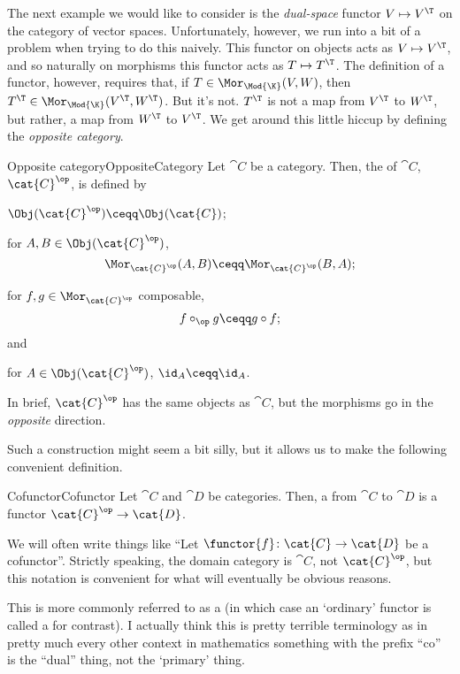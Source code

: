 The next example we would like to consider is the \emph{dual-space} functor $V\mapsto V^{\T}$ on the category of vector spaces.  Unfortunately, however, we run into a bit of a problem when trying to do this naively.  This functor on objects acts as $V\mapsto V^{\T}$, and so naturally on morphisms this functor acts as $T\mapsto T^{\T}$.  The definition of a functor, however, requires that, if $T\in \Mor _{\Mod{\K}}(V,W)$, then $T^{\T}\in \Mor _{\Mod{\K}}(V^{\T},W^{\T})$.  But it's not.  $T^{\T}$ is not a map from $V^{\T}$ to $W^{\T}$, but rather, a map from $W^{\T}$ to $V^{\T}$.  We get around this little hiccup by defining the \emph{opposite category}.
\begin{dfn}{Opposite category}{OppositeCategory}
	Let $\cat{C}$ be a category.  Then, the  of $\cat{C}$, $\cat{C}^{\op}$, is defined by
	\begin{data}
		\item $\Obj (\cat{C}^{\op})\ceqq \Obj (\cat{C})$;
		\item for $A,B\in \Obj (\cat{C}^{\op})$,
		\begin{equation}
		\Mor _{\cat{C}^{\op}}(A,B)\ceqq \Mor _{\cat{C}^{\op}}(B,A);
		\end{equation}
		\item for $f,g\in \Mor _{\cat{C}^{\op}}$ composable,
		\begin{equation}
		f\circ _{\op}g\ceqq g\circ f;
		\end{equation}
		and
		\item for $A\in \Obj (\cat{C}^{\op})$, $\id _A\ceqq \id _A$.
	\end{data}
	\begin{rmk}
		In brief, $\cat{C}^{\op}$ has the same objects as $\cat{C}$, but the morphisms go in the \emph{opposite} direction.
	\end{rmk}
\end{dfn}
Such a construction might seem a bit silly, but it allows us to make the following convenient definition.
\begin{dfn}{Cofunctor}{Cofunctor}
	Let $\cat{C}$ and $\cat{D}$ be categories.  Then, a  from $\cat{C}$ to $\cat{D}$ is a functor $\cat{C}^{\op}\rightarrow \cat{D}$.
	\begin{rmk}
		We will often write things like ``Let $\functor{f}\colon \cat{C}\rightarrow \cat{D}$ be a cofunctor\textellipsis ''.  Strictly speaking, the domain category is $\cat{C}$, not $\cat{C}^{\op}$, but this notation is convenient for what will eventually be obvious reasons.
	\end{rmk}
	\begin{rmk}
		This is more commonly referred to as a  (in which case an `ordinary' functor is called a  for contrast).  I actually think this is pretty terrible terminology as in pretty much every other context in mathematics something with the prefix ``co'' is the ``dual'' thing, not the `primary' thing.
	\end{rmk}
\end{dfn}

